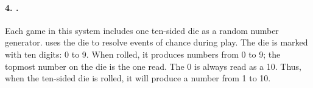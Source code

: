 \begin{figure}[h!]
\centering
{}
\end{figure}

\paragraph{4. \protect{}.} Each game in this system includes one ten-sided die as a random number generator. {\AirPow} uses the die to resolve events of chance during play. The die is marked with ten digits: 0 to 9. When rolled, it produces numbers from 0 to 9; the topmost number on the die is the one read. The 0 is always read as a 10. Thus, when the ten-sided die is rolled, it will produce a number from 1 to 10.

